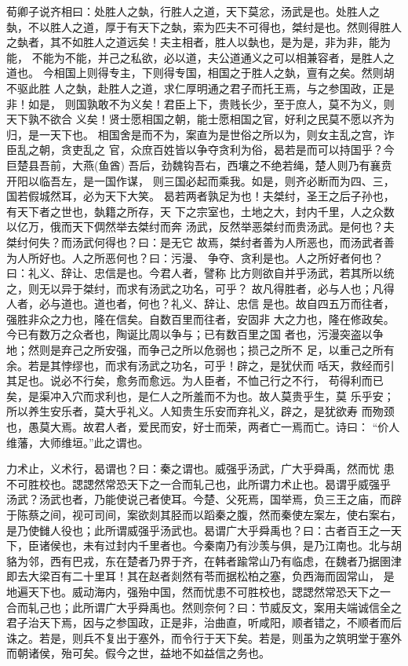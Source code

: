 \documentclass[]{article}
\begin{document}
荀卿子说齐相曰：处胜人之埶，行胜人之道，天下莫忿，汤武是也。处胜人之
埶，不以胜人之道，厚于有天下之埶，索为匹夫不可得也，桀纣是也。然则得胜人
之埶者，其不如胜人之道远矣！夫主相者，胜人以埶也，是为是，非为非，能为能，
不能为不能，并己之私欲，必以道，夫公道通义之可以相兼容者，是胜人之道也。
今相国上则得专主，下则得专国，相国之于胜人之埶，亶有之矣。然则胡不驱此胜
人之埶，赴胜人之道，求仁厚明通之君子而托王焉，与之参国政，正是非！如是，
则国孰敢不为义矣！君臣上下，贵贱长少，至于庶人，莫不为义，则天下孰不欲合
义矣！贤士愿相国之朝，能士愿相国之官，好利之民莫不愿以齐为归，是一天下也。
相国舍是而不为，案直为是世俗之所以为，则女主乱之宫，诈臣乱之朝，贪吏乱之
官，众庶百姓皆以争夺贪利为俗，曷若是而可以持国乎？今巨楚县吾前，大燕(鱼酋)
吾后，劲魏钩吾右，西壤之不绝若绳，楚人则乃有襄贲开阳以临吾左，是一国作谋，
则三国必起而乘我。如是，则齐必断而为四、三，国若假城然耳，必为天下大笑。
曷若两者孰足为也！夫桀纣，圣王之后子孙也，有天下者之世也，埶籍之所存，天
下之宗室也，土地之大，封内千里，人之众数以亿万，俄而天下倜然举去桀纣而奔
汤武，反然举恶桀纣而贵汤武。是何也？夫桀纣何失？而汤武何得也？曰：是无它
故焉，桀纣者善为人所恶也，而汤武者善为人所好也。人之所恶何也？曰：污漫、
争夺、贪利是也。人之所好者何也？曰：礼义、辞让、忠信是也。今君人者，譬称
比方则欲自并乎汤武，若其所以统之，则无以异于桀纣，而求有汤武之功名，可乎？
故凡得胜者，必与人也；凡得人者，必与道也。道也者，何也？礼义、辞让、忠信
是也。故自四五万而往者，强胜非众之力也，隆在信矣。自数百里而往者，安固非
大之力也，隆在修政矣。今已有数万之众者也，陶诞比周以争与；已有数百里之国
者也，污漫突盗以争地；然则是弃己之所安强，而争己之所以危弱也；损己之所不
足，以重己之所有余。若是其悖缪也，而求有汤武之功名，可乎！辟之，是犹伏而
咶天，救经而引其足也。说必不行矣，愈务而愈远。为人臣者，不恤己行之不行，
苟得利而已矣，是渠冲入穴而求利也，是仁人之所羞而不为也。故人莫贵乎生，莫
乐乎安；所以养生安乐者，莫大乎礼义。人知贵生乐安而弃礼义，辟之，是犹欲寿
而歾颈也，愚莫大焉。故君人者，爱民而安，好士而荣，两者亡一焉而亡。诗曰：
``价人维藩，大师维垣。''此之谓也。

力术止，义术行，曷谓也？曰：秦之谓也。威强乎汤武，广大乎舜禹，然而忧
患不可胜校也。諰諰然常恐天下之一合而轧己也，此所谓力术止也。曷谓乎威强乎
汤武？汤武也者，乃能使说己者使耳。今楚、父死焉，国举焉，负三王之庙，而辟
于陈蔡之间，视可司间，案欲剡其胫而以蹈秦之腹，然而秦使左案左，使右案右，
是乃使雠人役也；此所谓威强乎汤武也。曷谓广大乎舜禹也？曰：古者百王之一天
下，臣诸侯也，未有过封内千里者也。今秦南乃有沙羡与俱，是乃江南也。北与胡
貉为邻，西有巴戎，东在楚者乃界于齐，在韩者踰常山乃有临虑，在魏者乃据圉津
即去大梁百有二十里耳！其在赵者剡然有苓而据松柏之塞，负西海而固常山，
是地遍天下也。威动海内，强殆中国，然而忧患不可胜校也，諰諰然常恐天下之一
合而轧己也；此所谓广大乎舜禹也。然则奈何？曰：节威反文，案用夫端诚信全之
君子治天下焉，因与之参国政，正是非，治曲直，听咸阳，顺者错之，不顺者而后
诛之。若是，则兵不复出于塞外，而令行于天下矣。若是，则虽为之筑明堂于塞外
而朝诸侯，殆可矣。假今之世，益地不如益信之务也。
\end{document}
